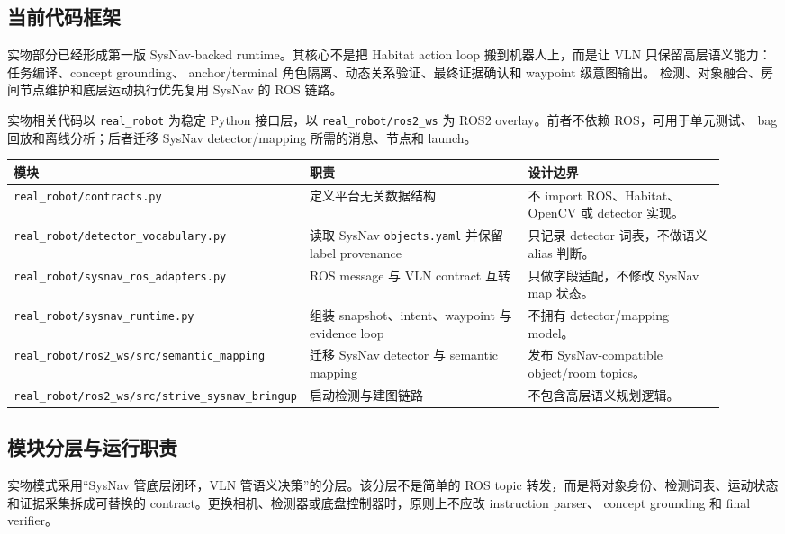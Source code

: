 \documentclass[UTF8,zihao=-4]{ctexart}
\begin{document}
\subsection{当前代码框架}

实物部分已经形成第一版 SysNav-backed runtime。其核心不是把 Habitat action loop
搬到机器人上，而是让 VLN 只保留高层语义能力：任务编译、concept grounding、
anchor/terminal 角色隔离、动态关系验证、最终证据确认和 waypoint 级意图输出。
检测、对象融合、房间节点维护和底层运动执行优先复用 SysNav 的 ROS 链路。

实物相关代码以 \texttt{real\_robot} 为稳定 Python 接口层，以
\texttt{real\_robot/ros2\_ws} 为 ROS2 overlay。前者不依赖 ROS，可用于单元测试、
bag 回放和离线分析；后者迁移 SysNav detector/mapping 所需的消息、节点和 launch。

\begin{longtable}{p{0.28\linewidth}p{0.34\linewidth}p{0.30\linewidth}}
\toprule
\textbf{模块} & \textbf{职责} & \textbf{设计边界} \\
\midrule
\texttt{real\_robot/contracts.py} &
定义平台无关数据结构 &
不 import ROS、Habitat、OpenCV 或 detector 实现。\\
\texttt{real\_robot/detector\_vocabulary.py} &
读取 SysNav \texttt{objects.yaml} 并保留 label provenance &
只记录 detector 词表，不做语义 alias 判断。\\
\texttt{real\_robot/sysnav\_ros\_adapters.py} &
ROS message 与 VLN contract 互转 &
只做字段适配，不修改 SysNav map 状态。\\
\texttt{real\_robot/sysnav\_runtime.py} &
组装 snapshot、intent、waypoint 与 evidence loop &
不拥有 detector/mapping model。\\
\texttt{real\_robot/ros2\_ws/src/semantic\_mapping} &
迁移 SysNav detector 与 semantic mapping &
发布 SysNav-compatible object/room topics。\\
\texttt{real\_robot/ros2\_ws/src/strive\_sysnav\_bringup} &
启动检测与建图链路 &
不包含高层语义规划逻辑。\\
\bottomrule
\end{longtable}

\subsection{模块分层与运行职责}

实物模式采用“SysNav 管底层闭环，VLN 管语义决策”的分层。该分层不是简单的
ROS topic 转发，而是将对象身份、检测词表、运动状态和证据采集拆成可替换的
contract。更换相机、检测器或底盘控制器时，原则上不应改 instruction parser、
concept grounding 和 final verifier。
\end{document}
